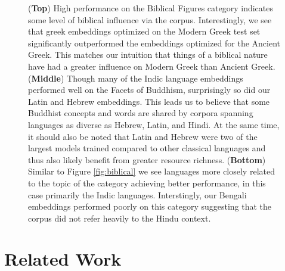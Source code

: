 \documentclass[11pt,a4paper]{article}
\begin{document}
\begin{figure}
\caption{
    (\textbf{Top})
    High performance on the Biblical Figures category indicates some level of biblical influence via the corpus. 
    Interestingly, we see that greek embeddings optimized on the Modern Greek test set significantly outperformed the embeddings optimized for the Ancient Greek. 
    This matches our intuition that things of a biblical nature have had a greater influence on Modern Greek than Ancient Greek.
    (\textbf{Middle})
    Though many of the Indic language embeddings performed well on the Facets of Buddhism, 
    surprisingly so did our Latin and Hebrew embeddings. 
    This leads us to believe that some Buddhist concepts and words are shared by corpora spanning languages as diverse as Hebrew, Latin, and Hindi. 
    At the same time, it should also be noted that Latin and Hebrew were two of the largest models trained compared to other classical languages and thus also likely benefit from greater resource richness.
    (\textbf{Bottom})
    Similar to Figure \ref{fig:biblical} we see languages more closely related to the topic of the category achieving better performance, in this case primarily the Indic languages. 
    Interstingly, our Bengali embeddings performed poorly on this category suggesting that the corpus did not refer heavily to the Hindu context.
    }
\end{figure}


\section{Related Work}
\label{sec:related}



\end{document}
